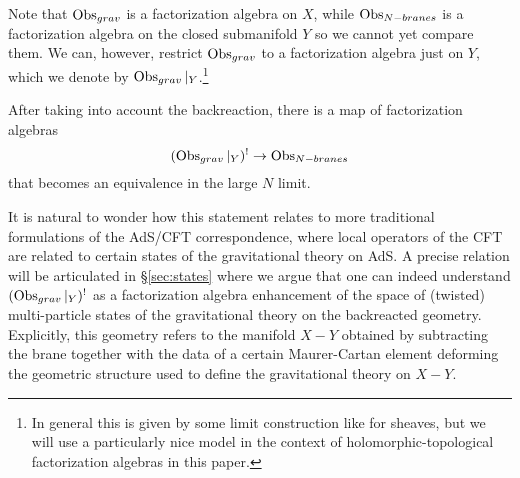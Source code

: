 Note that $\operatorname{Obs}_{grav}$ is a factorization algebra on $X$, while $\operatorname{Obs}_{N-branes}$ is a factorization algebra on the closed submanifold $Y$ so we cannot yet compare them.
We can, however, restrict $\operatorname{Obs}_{grav}$ to a factorization algebra just on $Y$, which we denote by $\operatorname{Obs}_{grav}|_Y$.\footnote{In general this is given by some limit construction like for sheaves, but we will use a particularly nice model in the context of holomorphic-topological factorization algebras in this paper.}

\begin{expect}
After taking into account the backreaction, there is a map of factorization algebras
\[
  (\operatorname{Obs}_{grav}|_{Y})^{!}\to \operatorname{Obs}_{N-branes}
\]
that becomes an equivalence in the large $N$ limit.
\end{expect}

It is natural to wonder how this statement relates to more traditional formulations of the AdS/CFT correspondence, where local operators of the CFT are related to certain states of the gravitational theory on AdS. A precise relation will be articulated in \S\ref{sec:states} where we argue that one can indeed understand $(\operatorname{Obs}_{grav}|_{Y})^{!}$ as a factorization algebra enhancement of the space of (twisted) multi-particle states of the gravitational theory on the backreacted geometry. Explicitly, this geometry refers to the manifold $X - Y$ obtained by subtracting the brane together with the data of a certain Maurer-Cartan element deforming the geometric structure used to define the gravitational theory on $X - Y$.

